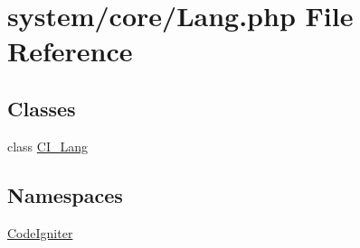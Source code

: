 \hypertarget{_lang_8php}{}\section{system/core/\+Lang.php File Reference}
\label{_lang_8php}
\subsection*{Classes}
\begin{DoxyCompactItemize}
\item 
class \mbox{\hyperlink{class_c_i___lang}{C\+I\+\_\+\+Lang}}
\end{DoxyCompactItemize}
\subsection*{Namespaces}
\begin{DoxyCompactItemize}
\item 
 \mbox{\hyperlink{namespace_code_igniter}{Code\+Igniter}}
\end{DoxyCompactItemize}
